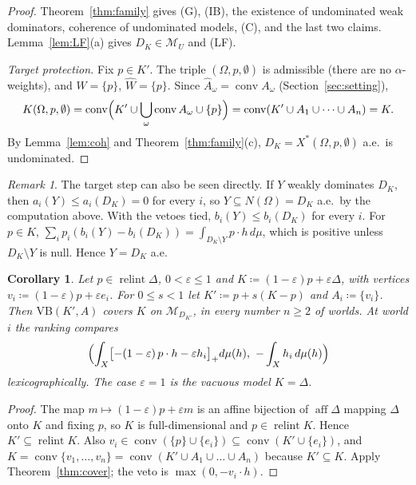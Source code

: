 \documentclass[11pt]{article}
\newcommand{\M}{\mathcal{M}}
\newcommand{\VB}{\mathrm{VB}}
\DeclareMathOperator{\conv}{conv}
\DeclareMathOperator{\relint}{relint}
\DeclareMathOperator{\aff}{aff}
\theoremstyle{plain}
\newtheorem{corollary}[theorem]{Corollary}
\theoremstyle{definition}
\theoremstyle{remark}
\newtheorem{remark}[theorem]{Remark}
\begin{document}
\begin{proof}
Theorem~\ref{thm:family} gives (G), (IB), the existence of undominated weak dominators,
coherence of undominated models, (C), and the last two claims. Lemma~\ref{lem:LF}(a)
gives $D_K\in\M_U$ and (LF).

\emph{Target protection.} Fix $p\in K'$. The triple $(\Omega,p,\emptyset)$ is admissible
(there are no $\alpha$-weights), and $W=\{p\}$, $\hat W=\{p\}$. Since $\hat
A_\omega=\conv A_\omega$ (Section~\ref{sec:setting}),
\[
  K(\Omega,p,\emptyset)=\conv\Bigl(K'\cup\bigcup_\omega\conv A_\omega\cup\{p\}\Bigr)
  =\conv(K'\cup A_1\cup\dots\cup A_n)=K .
\]
By Lemma~\ref{lem:coh} and Theorem~\ref{thm:family}(c), $D_K=X^\ast(\Omega,p,\emptyset)$
a.e.\ is undominated.
\end{proof}

\begin{remark}\label{rem:direct}
The target step can also be seen directly. If $Y$ weakly dominates $D_K$, then
$a_i(Y)\le a_i(D_K)=0$ for every $i$, so $Y\subseteq N(\Omega)=D_K$ a.e.\ by the
computation above. With the vetoes tied, $b_i(Y)\le b_i(D_K)$ for every $i$. For $p\in K$,
$\sum_ip_i(b_i(Y)-b_i(D_K))=\int_{D_K\setminus Y}p\cdot h\,d\mu$, which is positive unless
$D_K\setminus Y$ is null. Hence $Y=D_K$ a.e.
\end{remark}

\begin{corollary}\label{cor:contam}
Let $p\in\relint\Delta$, $0<\varepsilon\le1$ and $K\coloneqq(1-\varepsilon)p+
\varepsilon\Delta$, with vertices $v_i\coloneqq(1-\varepsilon)p+\varepsilon e_i$. For
$0\le s<1$ let $K'\coloneqq p+s(K-p)$ and $A_i\coloneqq\{v_i\}$. Then $\VB(K',A)$ covers
$K$ on $\M_{D_{K'}}$, in every number $n\ge2$ of worlds. At world $i$ the ranking compares
\[
  \Bigl(\int_X\bigl[-(1-\varepsilon)\,p\cdot h-\varepsilon h_i\bigr]_+d\mu(h),\
  -\int_Xh_i\,d\mu(h)\Bigr)
\]
lexicographically. The case $\varepsilon=1$ is the vacuous model $K=\Delta$.
\end{corollary}

\begin{proof}
The map $m\mapsto(1-\varepsilon)p+\varepsilon m$ is an affine bijection of $\aff\Delta$
mapping $\Delta$ onto $K$ and fixing $p$, so $K$ is full-dimensional and $p\in\relint K$.
Hence $K'\subseteq\relint K$. Also $v_i\in\conv(\{p\}\cup\{e_i\})\subseteq\conv(K'\cup
\{e_i\})$, and $K=\conv\{v_1,\dots,v_n\}=\conv(K'\cup A_1\cup\dots\cup A_n)$ because
$K'\subseteq K$. Apply Theorem~\ref{thm:cover}; the veto is $\max(0,-v_i\cdot h)$.
\end{proof}
\end{document}
